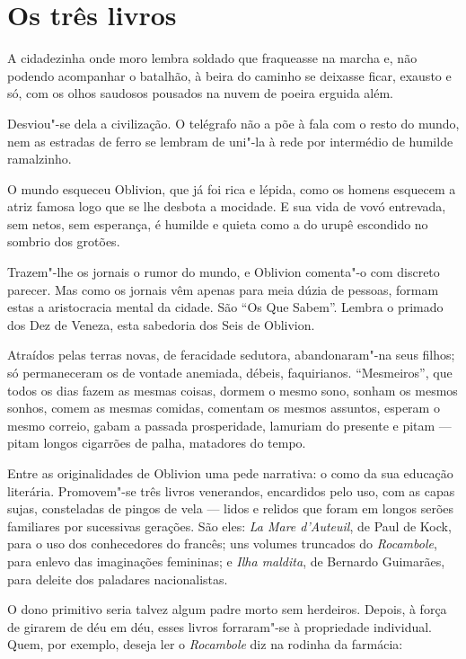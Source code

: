 \section*{Os três livros}

A cidadezinha onde moro lembra soldado que fraqueasse na marcha e, não
podendo acompanhar o batalhão, à beira do caminho se deixasse ficar,
exausto e só, com os olhos saudosos pousados na nuvem de poeira erguida
além.

Desviou"-se dela a civilização. O telégrafo não a põe à fala com o resto
do mundo, nem as estradas de ferro se lembram de uni"-la à rede por
intermédio de humilde ramalzinho.

O mundo esqueceu Oblivion, que já foi rica e lépida, como os homens
esquecem a atriz famosa logo que se lhe desbota a mocidade. E sua vida
de vovó entrevada, sem netos, sem esperança, é humilde e quieta como a
do urupê escondido no sombrio dos grotões.

Trazem"-lhe os jornais o rumor do mundo, e Oblivion comenta"-o com
discreto parecer. Mas como os jornais vêm apenas para meia dúzia de
pessoas, formam estas a aristocracia mental da cidade. São ``Os Que
Sabem''. Lembra o primado dos Dez de Veneza, esta sabedoria dos Seis de
Oblivion.

Atraídos pelas terras novas, de feracidade sedutora, abandonaram"-na seus
filhos; só permaneceram os de vontade anemiada, débeis, faquirianos.
``Mesmeiros'', que todos os dias fazem as mesmas coisas, dormem o mesmo
sono, sonham os mesmos sonhos, comem as mesmas comidas, comentam os
mesmos assuntos, esperam o mesmo correio, gabam a passada prosperidade,
lamuriam do presente e pitam --- pitam longos cigarrões de palha,
matadores do tempo.

Entre as originalidades de Oblivion uma pede narrativa: o como da sua
educação literária. Promovem"-se três livros venerandos, encardidos pelo
uso, com as capas sujas, consteladas de pingos de vela --- lidos e
relidos que foram em longos serões familiares por sucessivas gerações.
São eles: \emph{La Mare d'Auteuil}, de Paul de Kock, para o uso dos
conhecedores do francês; uns volumes truncados do \emph{Rocambole}, para
enlevo das imaginações femininas; e \emph{Ilha maldita}, de Bernardo
Guimarães, para deleite dos paladares nacionalistas.

O dono primitivo seria talvez algum padre morto sem herdeiros. Depois, à
força de girarem de déu em déu, esses livros forraram"-se à propriedade
individual. Quem, por exemplo, deseja ler o \emph{Rocambole} diz na
rodinha da farmácia:

